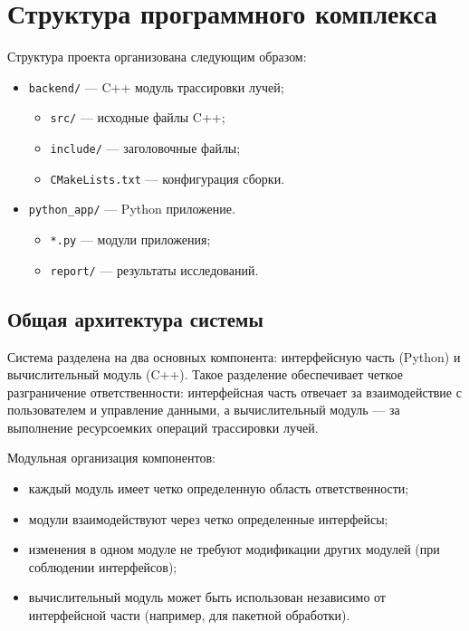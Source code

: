 \section{Структура программного комплекса}

Структура проекта организована следующим образом:

\begin{itemize}
    \item \texttt{backend/} --- C++ модуль трассировки лучей;
    \begin{itemize}
        \item \texttt{src/} --- исходные файлы C++;
        \item \texttt{include/} --- заголовочные файлы;
        \item \texttt{CMakeLists.txt} --- конфигурация сборки.
    \end{itemize}
    \item \texttt{python\_app/} --- Python приложение.
    \begin{itemize}
        \item \texttt{*.py} --- модули приложения;
        \item \texttt{report/} --- результаты исследований.
    \end{itemize}
\end{itemize}

\subsection{Общая архитектура системы}

Система разделена на два основных компонента: интерфейсную часть (Python) и вычислительный модуль (C++). Такое разделение обеспечивает четкое разграничение ответственности: интерфейсная часть отвечает за взаимодействие с пользователем и управление данными, а вычислительный модуль --- за выполнение ресурсоемких операций трассировки лучей.

Модульная организация компонентов:
\begin{itemize}
    \item каждый модуль имеет четко определенную область ответственности;
    \item модули взаимодействуют через четко определенные интерфейсы;
    \item изменения в одном модуле не требуют модификации других модулей (при соблюдении интерфейсов);
    \item вычислительный модуль может быть использован независимо от интерфейсной части (например, для пакетной обработки).
\end{itemize}

